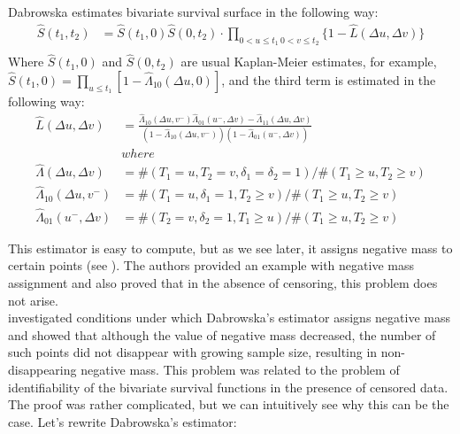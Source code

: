 \documentclass[]{article}
\begin{document}
Dabrowska estimates bivariate survival surface in the following way:
	$$
	\begin{aligned}
		\hat{S}(t_1,t_2) &= \hat{S}(t_1,0)\hat{S}(0,t_2)\cdot \prod_{{0<u\leq t_1~0<v\leq t_2}}\{1 - \hat{L}(\Delta u, \Delta v)\}\\
	\end{aligned}
	$$
Where $\hat{S}(t_1,0)$ and $\hat{S}(0,t_2)$ are usual Kaplan-Meier estimates, for example, $\hat{S}(t_1,0) = \prod_{u\leq t_1}[1-\hat{\Lambda}_{10}(\Delta u, 0)]$, and the third term is estimated in the following way:
	$$
	\begin{aligned}
    \hat{L}(\Delta u, \Delta v) &= \frac{\hat{\Lambda}_{10}(\Delta u,v^-)\hat{\Lambda}_{01}(u^-,\Delta v) - \hat{\Lambda}_{11}(\Delta u,\Delta v)}{\left(1-\hat{\Lambda}_{10}(\Delta u,v^-)\right)\left(1-\hat{\Lambda}_{01}(u^-,\Delta v)\right)}\\
  &where\\
	\hat{\Lambda}(\Delta u, \Delta v) &= \#(T_1=u, T_2=v, \delta_1=\delta_2=1)/\#(T_1\geq u, T_2\geq v)\\
	\hat{\Lambda}_{10}(\Delta u, v^-) &= \#(T_1=u, \delta_1=1, T_2\geq v)/\#(T_1\geq u, T_2\geq v)\\
	\hat{\Lambda}_{01}(u^-,\Delta  v) &= \#(T_2=v, \delta_2=1, T_1\geq u)/\#(T_1\geq u, T_2\geq v)
	\end{aligned}
	$$

This estimator is easy to compute, but as we see later, it assigns negative mass to certain points (see ). The authors provided an example with negative mass assignment and also proved that in the absence of censoring, this problem does not arise.\\

\cite{pruitt1991negative} investigated conditions under which Dabrowska's estimator assigns negative mass and showed that although the value of negative mass decreased, the number of such points did not disappear with growing sample size, resulting in non-disappearing negative mass. This problem was related to the problem of identifiability of the bivariate survival functions in the presence of censored data. The proof was rather complicated, but we can intuitively see why this can be the case. Let's rewrite Dabrowska's estimator:
\end{document}
